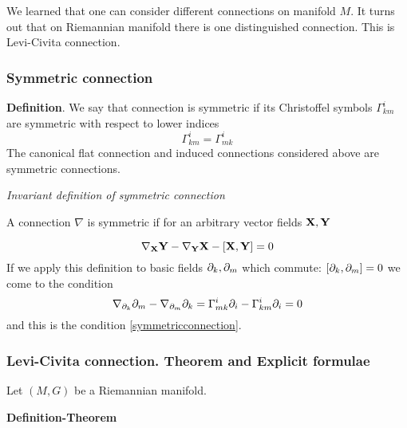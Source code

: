 \documentclass[12pt]{article}
\theoremstyle{theorem}
\numberwithin{equation}{section}
\begin{document}
We learned that one can consider 
different connections on manifold $M$.
It turns out that on Riemannian manifold 
there is one distinguished connection.
This is Levi-Civita connection.

  \subsubsection {Symmetric connection}



 {\bf Definition}. We say that connection is symmetric if its Christoffel symbols $\Gamma^i_{km}$ are symmetric with respect to
  lower indices
  \begin{equation}\label{symmetricconnection}
    \Gamma^i_{km}=\Gamma^i_{mk}
  \end{equation}
  The canonical flat connection 
  and induced connections 
  considered above are symmetric connections.

  \m

  {\footnotesize

   \centerline {\it Invariant definition of symmetric connection}

  A connection $\nabla$ is symmetric if for an arbitrary vector fields ${\bf X},{\bf Y}$

  \begin{equation}\label{symmetricconnectioninvariant}
    \nabla_{\bf X} {\bf Y}-\nabla_{\bf Y} {\bf X}-[{\bf X},{\bf Y}]=0
  \end{equation}
  If we apply this definition to basic fields $\partial_k,\partial_m$ which commute: $[\partial_k,\partial_m]=0$
  we come to the
  condition
          $$
     \nabla_{\partial_k}\partial_m-\nabla_{\partial_m}\partial_k=\Gamma_{mk}^i\partial_i-\Gamma_{km}^i\partial_i=0
          $$
 and this is the condition  \eqref{symmetricconnection}.
  }



  \subsubsection {Levi-Civita connection. 
Theorem and Explicit formulae}\label{levicivitaconnection1}
Let $(M, G)$ be a Riemannian manifold.

{\bf Definition-Theorem}
\end{document}

